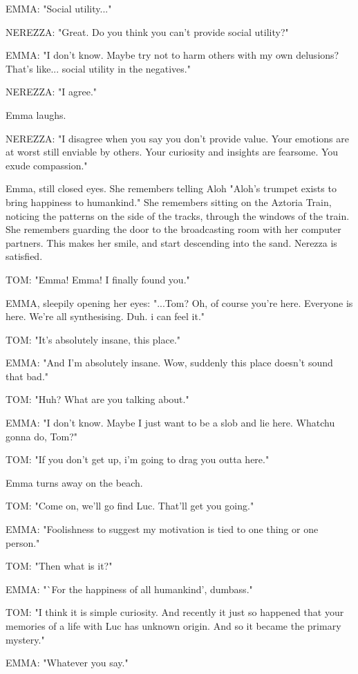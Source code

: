 \documentclass[11pt]{article}
\begin{document}
EMMA: "Social utility..."

NEREZZA: "Great. Do you think you can't provide social utility?"

EMMA: "I don't know. 
Maybe try not to harm others with my own delusions?
That's like... social utility in the negatives."

NEREZZA: "I agree."

Emma laughs.

NEREZZA: "I disagree when you say you don't provide value.
Your emotions are at worst still enviable by others.
Your curiosity and insights are fearsome.
You exude compassion."

Emma, still closed eyes.
She remembers telling Aloh "Aloh's trumpet exists to bring happiness to humankind."
She remembers sitting on the Aztoria Train, noticing the patterns on the side of the tracks, through the windows of the train.
She remembers guarding the door to the broadcasting room with her computer partners.
This makes her smile, and start descending into the sand.
Nerezza is satisfied.

TOM: "Emma! Emma! I finally found you."

EMMA, sleepily opening her eyes: "...Tom? 
Oh, of course you're here. 
Everyone is here.
We're all synthesising. Duh.
i can feel it."

TOM: "It's absolutely insane, this place."

EMMA: "And I'm absolutely insane. Wow, suddenly this place doesn't sound that bad."

TOM: "Huh? What are you talking about."

EMMA: "I don't know.
Maybe I just want to be a slob and lie here.
Whatchu gonna do, Tom?"

TOM: "If you don't get up, i'm going to drag you outta here."

Emma turns away on the beach.

TOM: "Come on, we'll go find Luc.
That'll get you going."

EMMA: "Foolishness to suggest my motivation is tied to one thing or one person."

TOM: "Then what is it?"

EMMA: "`For the happiness of all humankind', dumbass."

TOM: "I think it is simple curiosity.
And recently it just so happened that your memories of a life with Luc has unknown origin.
And so it became the primary mystery."

EMMA: "Whatever you say."
\end{document}
